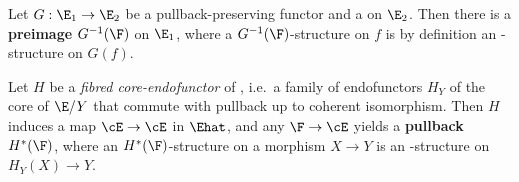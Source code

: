 
\begin{eg}\label{eg:preimage-fcos}
  Let $G:\E_1\to\E_2$ be a pullback-preserving functor and \F a \nfs on $\E_2$.
  Then there is a \textbf{preimage} \nfs $G^{-1}(\F)$ on $\E_1$, where a $G^{-1}(\F)$-structure on $f$ is by definition an \F-structure on $G(f)$.
\end{eg}

\begin{eg}\label{eg:fend-fcos}
  Let $H$ be a \emph{fibred core-endofunctor} of \E, i.e.\ a family of endofunctors $H_Y$ of the core of $\E/Y$ that commute with pullback up to coherent isomorphism.
  Then $H$ induces a map $\cE\to\cE$ in $\Ehat$, and any \nfs $\F\to\cE$ yields a \textbf{pullback} \nfs $H^*(\F)$, where an $H^*(\F)$-structure on a morphism $X\to Y$ is an \F-structure on $H_Y(X) \to Y$.
\end{eg}

